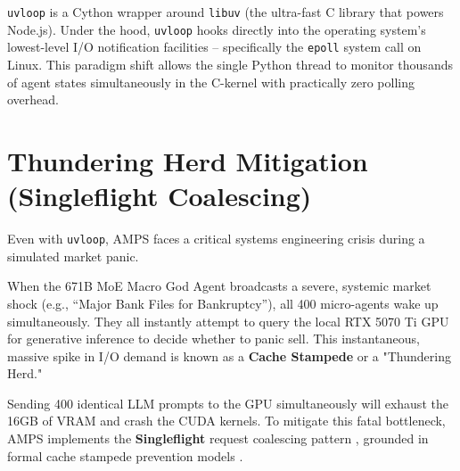 \texttt{uvloop} is a Cython wrapper around \texttt{libuv} (the ultra-fast C library that powers Node.js). Under the hood, \texttt{uvloop} hooks directly into the operating system's lowest-level I/O notification facilities -- specifically the \texttt{epoll} system call on Linux. This paradigm shift allows the single Python thread to monitor thousands of agent states simultaneously in the C-kernel with practically zero polling overhead.

\section{Thundering Herd Mitigation (Singleflight Coalescing)}

Even with \texttt{uvloop}, AMPS faces a critical systems engineering crisis during a simulated market panic. 

When the 671B MoE Macro God Agent broadcasts a severe, systemic market shock (e.g., ``Major Bank Files for Bankruptcy''), all 400 micro-agents wake up simultaneously. They all instantly attempt to query the local RTX 5070 Ti GPU for generative inference to decide whether to panic sell. This instantaneous, massive spike in I/O demand is known as a \textbf{Cache Stampede} or a "Thundering Herd."

Sending 400 identical LLM prompts to the GPU simultaneously will exhaust the 16GB of VRAM and crash the CUDA kernels. To mitigate this fatal bottleneck, AMPS implements the \textbf{Singleflight} request coalescing pattern \cite{fitzpatrick2018singleflight}, grounded in formal cache stampede prevention models \cite{vattani2015cache}.

